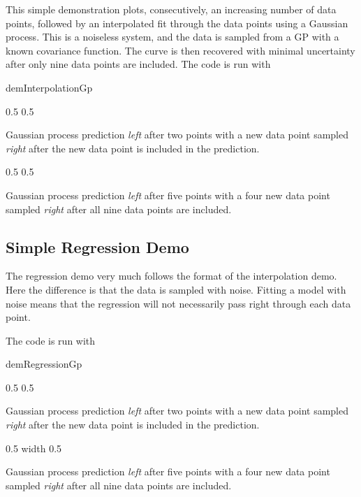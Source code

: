 This simple demonstration plots, consecutively, an increasing
number of data points, followed by an interpolated fit through the
data points using a Gaussian process. This is a noiseless system, and
the data is sampled from a GP with a known covariance function. The
curve is then recovered with minimal uncertainty after only nine data
points are included. The code is run with

\begin{octave}
 demInterpolationGp
\end{octave}

\begin{center}

 0.5\textwidth {} 0.5\textwidth

Gaussian process prediction \emph{left} after two points with a new
data point sampled \emph{right} after the new data point is included
in the prediction. 

 0.5\textwidth {} 0.5\textwidth

Gaussian process prediction \emph{left} after five points with a four
new data point sampled \emph{right} after all nine data points are
included. 
\end{center}

\subsection{Simple Regression Demo}

The regression demo very much follows the format of the
interpolation demo. Here the difference is that the data is sampled
with noise. Fitting a model with noise means that the regression will
not necessarily pass right through each data point.

The code is run with

\begin{octave}
 demRegressionGp
\end{octave}


\begin{center}
 0.5\textwidth {} 0.5\textwidth

Gaussian process prediction \emph{left} after two points with a new
data point sampled \emph{right} after the new data point is included
in the prediction. 

 0.5\textwidth {} width 0.5\textwidth

Gaussian process prediction \emph{left} after five points with a four
new data point sampled \emph{right} after all nine data points are
included. 
\end{center}

